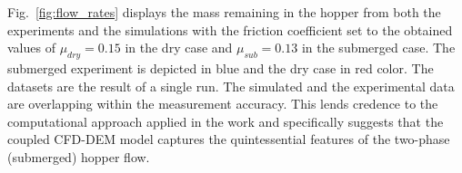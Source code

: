 \documentclass[twoside,twocolumn,9pt]{article}
\providecommand{\DIFadd}[1]{{\protect\color{blue}\uwave{#1}}} %
\providecommand{\DIFaddbegin}{} %
\providecommand{\DIFaddend}{} %
\providecommand{\DIFdelbegin}{} %
\providecommand{\DIFdelend}{} %
\newcommand{\DIFscaledelfig}{0.5}
\newlength{\DIFdelgraphicswidth} %
\newlength{\DIFdelgraphicsheight} %
\newcommand{\DIFaddincludegraphics}[2][]{{\color{blue}\fbox{\DIFOincludegraphics[#1]{#2}}}} %
\newcommand{\DIFdelincludegraphics}[2][]{%
\sbox{\DIFdelgraphicsbox}{\DIFOincludegraphics[#1]{#2}}%
\settoboxwidth{\DIFdelgraphicswidth}{\DIFdelgraphicsbox} %
\settoboxtotalheight{\DIFdelgraphicsheight}{\DIFdelgraphicsbox} %
\scalebox{\DIFscaledelfig}{%
\parbox[b]{\DIFdelgraphicswidth}{\usebox{\DIFdelgraphicsbox}\\[-\baselineskip] \rule{\DIFdelgraphicswidth}{0em}}\llap{\resizebox{\DIFdelgraphicswidth}{\DIFdelgraphicsheight}{%
\setlength{\unitlength}{\DIFdelgraphicswidth}%
\begin{picture}(1,1)%
\thicklines\linethickness{2pt} %
{\color[rgb]{1,0,0}\put(0,0){\framebox(1,1){}}}%
{\color[rgb]{1,0,0}\put(0,0){\line( 1,1){1}}}%
{\color[rgb]{1,0,0}\put(0,1){\line(1,-1){1}}}%
\end{picture}%
}\hspace*{3pt}}} %
} %
\DeclareRobustCommand{\DIFaddbegin}{\DIFOaddbegin \let\includegraphics\DIFaddincludegraphics} %
\DeclareRobustCommand{\DIFaddend}{\DIFOaddend \let\includegraphics\DIFOincludegraphics} %
\DeclareRobustCommand{\DIFdelbegin}{\DIFOdelbegin \let\includegraphics\DIFdelincludegraphics} %
\DeclareRobustCommand{\DIFdelend}{\DIFOaddend \let\includegraphics\DIFOincludegraphics} %
\begin{document}
\DIFdelbegin %



\DIFdelend \DIFaddbegin {\DIFaddend Fig.~\ref{fig:flow_rates} displays the mass \DIFaddbegin \DIFadd{of grains }\DIFaddend remaining in the hopper from both the experiments and the simulations with the friction coefficient set to the obtained values of $\mu_{dry}=0.15$ in the dry case and $\mu_{sub}=0.13$ in the submerged case. The submerged experiment is depicted in blue and the dry case in red color. The datasets are the result of a single run. The simulated and the experimental data are overlapping within the measurement accuracy. This lends credence to the computational approach applied in the work and specifically suggests that the coupled CFD-DEM model captures the quintessential features of the two-phase (submerged) hopper flow.\DIFaddbegin }
\end{document}
